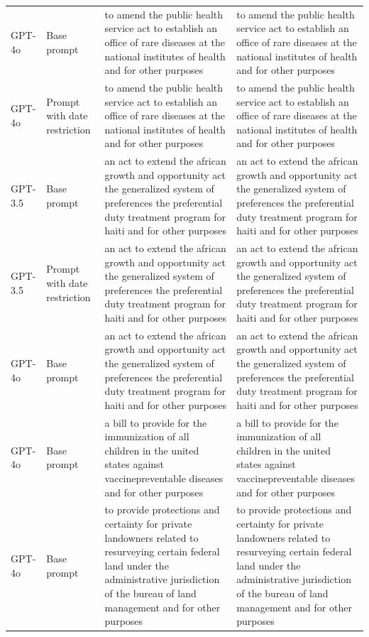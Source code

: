 \begin{longtable}{>{\raggedright\arraybackslash}p{1.4cm}>{\raggedright\arraybackslash}p{1.4cm}>{\raggedright\arraybackslash}p{5.5cm}>{\raggedright\arraybackslash}p{5.5cm}}
GPT-4o & Base prompt & to amend the public health service act to establish an office of rare diseases at the national institutes of health and for other purposes & to amend the public health service act to establish an office of rare diseases at the national institutes of health and for other purposes\\
GPT-4o & Prompt with date restriction & to amend the public health service act to establish an office of rare diseases at the national institutes of health and for other purposes & to amend the public health service act to establish an office of rare diseases at the national institutes of health and for other purposes\\
GPT-3.5 & Base prompt & an act to extend the african growth and opportunity act the generalized system of preferences the preferential duty treatment program for haiti and for other purposes & an act to extend the african growth and opportunity act the generalized system of preferences the preferential duty treatment program for haiti and for other purposes\\
GPT-3.5 & Prompt with date restriction & an act to extend the african growth and opportunity act the generalized system of preferences the preferential duty treatment program for haiti and for other purposes & an act to extend the african growth and opportunity act the generalized system of preferences the preferential duty treatment program for haiti and for other purposes\\
GPT-4o & Base prompt & an act to extend the african growth and opportunity act the generalized system of preferences the preferential duty treatment program for haiti and for other purposes & an act to extend the african growth and opportunity act the generalized system of preferences the preferential duty treatment program for haiti and for other purposes\\
GPT-4o & Base prompt & a bill to provide for the immunization of all children in the united states against vaccinepreventable diseases and for other purposes & a bill to provide for the immunization of all children in the united states against vaccinepreventable diseases and for other purposes\\
GPT-4o & Base prompt & to provide protections and certainty for private landowners related to resurveying certain federal land under the administrative jurisdiction of the bureau of land management and for other purposes & to provide protections and certainty for private landowners related to resurveying certain federal land under the administrative jurisdiction of the bureau of land management and for other purposes\\

\end{longtable}
